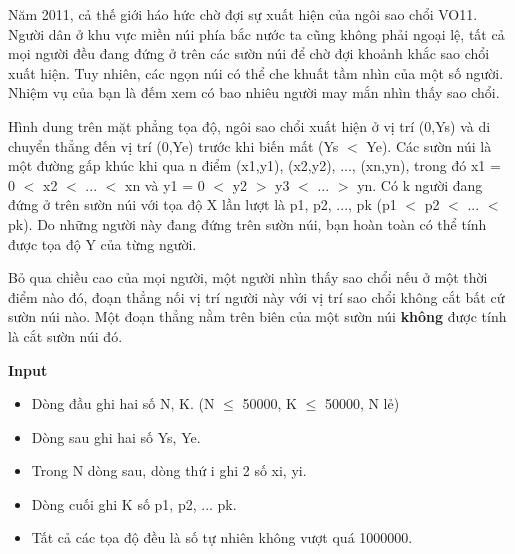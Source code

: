 Năm 2011, cả thế giới háo hức chờ đợi sự xuất hiện của ngôi sao chổi VO11. Người dân ở khu vực miền núi phía bắc nước ta cũng không phải ngoại lệ, tất cả mọi người đều đang đứng ở trên các sườn núi để chờ đợi khoảnh khắc sao chổi xuất hiện. Tuy nhiên, các ngọn núi có thể che khuất tầm nhìn của một số người. Nhiệm vụ của bạn là đếm xem có bao nhiêu người may mắn nhìn thấy sao chổi.

Hình dung trên mặt phẳng tọa độ, ngôi sao chổi xuất hiện ở vị trí (0,Ys) và di chuyển thẳng đến vị trí (0,Ye) trước khi biến mất (Ys $<$ Ye). Các sườn núi là một đường gấp khúc khi qua n điểm (x1,y1), (x2,y2), ..., (xn,yn), trong đó x1 = 0 $<$ x2 $<$ ... $<$ xn và y1 = 0 $<$ y2 $>$ y3 $<$ ... $>$ yn. Có k người đang đứng ở trên sườn núi với tọa độ X lần lượt là p1, p2, ..., pk (p1 $<$ p2 $<$ ... $<$ pk). Do những người này đang đứng trên sườn núi, bạn hoàn toàn có thể tính được tọa độ Y của từng người.

Bỏ qua chiều cao của mọi người, một người nhìn thấy sao chổi nếu ở một thời điểm nào đó, đoạn thẳng nối vị trí người này với vị trí sao chổi không cắt bất cứ sườn núi nào. Một đoạn thẳng nằm trên biên của một sườn núi \textbf{ không } được tính là cắt sườn núi đó.

\textbf{Input }
\begin{itemize}
	\item Dòng đầu ghi hai số N, K. (N  $\le$  50000, K  $\le$  50000, N lẻ)
	\item Dòng sau ghi hai số Ys, Ye.
	\item Trong N dòng sau, dòng thứ i ghi 2 số xi, yi.
	\item Dòng cuối ghi K số p1, p2, ... pk.
	\item Tất cả các tọa độ đều là số tự nhiên không vượt quá 1000000.
\end{itemize}

\